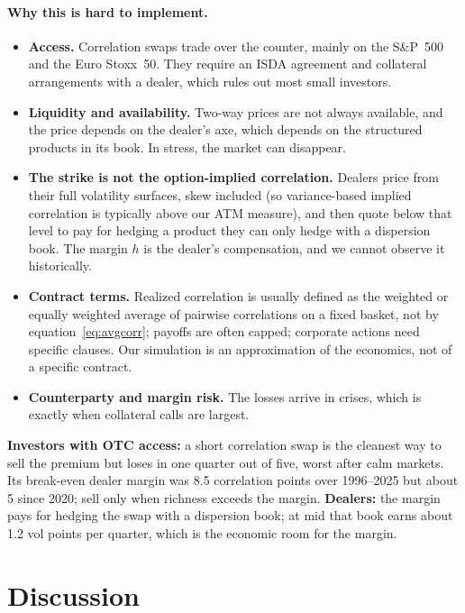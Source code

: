 \paragraph{Why this is hard to implement.}
\begin{itemize}
  \item \textbf{Access.} Correlation swaps trade over the counter, mainly on the S\&P~500 and the Euro Stoxx~50. They require an ISDA agreement and collateral arrangements with a dealer, which rules out most small investors.
  \item \textbf{Liquidity and availability.} Two-way prices are not always available, and the price depends on the dealer's axe, which depends on the structured products in its book. In stress, the market can disappear.
  \item \textbf{The strike is not the option-implied correlation.} Dealers price from their full volatility surfaces, skew included (so variance-based implied correlation is typically above our ATM measure), and then quote below that level to pay for hedging a product they can only hedge with a dispersion book. The margin $h$ is the dealer's compensation, and we cannot observe it historically.
  \item \textbf{Contract terms.} Realized correlation is usually defined as the weighted or equally weighted average of pairwise correlations on a fixed basket, not by equation~\eqref{eq:avgcorr}; payoffs are often capped; corporate actions need specific clauses. Our simulation is an approximation of the economics, not of a specific contract.
  \item \textbf{Counterparty and margin risk.} The losses arrive in crises, which is exactly when collateral calls are largest.
\end{itemize}

\begin{desk}
\textbf{Investors with OTC access:} a short correlation swap is the cleanest way to sell the premium but loses in one quarter out of five, worst after calm markets. Its break-even dealer margin was 8.5 correlation points over 1996--2025 but about 5 since 2020; sell only when richness exceeds the margin. \textbf{Dealers:} the margin pays for hedging the swap with a dispersion book; at mid that book earns about 1.2 vol points per quarter, which is the economic room for the margin.
\end{desk}

\section{Discussion}\label{sec:discussion}

